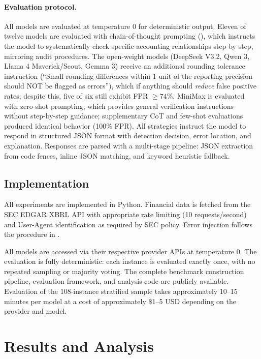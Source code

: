 \documentclass[11pt]{article}
\begin{document}
\paragraph{Evaluation protocol.}
All models are evaluated at temperature 0 for deterministic output.
Eleven of twelve models are evaluated with chain-of-thought prompting (), which instructs the model to systematically check specific accounting relationships step by step, mirroring audit procedures.
The open-weight models (DeepSeek V3.2, Qwen 3, Llama 4 Maverick/Scout, Gemma 3) receive an additional rounding tolerance instruction (``Small rounding differences within 1 unit of the reporting precision should NOT be flagged as errors''), which if anything should \emph{reduce} false positive rates; despite this, five of six still exhibit FPR $\geq 74\%$.
MiniMax is evaluated with zero-shot prompting, which provides general verification instructions without step-by-step guidance; supplementary CoT and few-shot evaluations produced identical behavior (100\% FPR).
All strategies instruct the model to respond in structured JSON format with detection decision, error location, and explanation.
Responses are parsed with a multi-stage pipeline: JSON extraction from code fences, inline JSON matching, and keyword heuristic fallback.

\subsection{Implementation}
\label{sec:implementation}

All experiments are implemented in Python.
Financial data is fetched from the SEC EDGAR XBRL API with appropriate rate limiting (10 requests/second) and User-Agent identification as required by SEC policy.
Error injection follows the procedure in .

All models are accessed via their respective provider APIs at temperature 0.
The evaluation is fully deterministic: each instance is evaluated exactly once, with no repeated sampling or majority voting.
The complete benchmark construction pipeline, evaluation framework, and analysis code are publicly available.
Evaluation of the 108-instance stratified sample takes approximately 10--15 minutes per model at a cost of approximately \$1--5 USD depending on the provider and model.

\section{Results and Analysis}
\label{sec:results}
\end{document}

